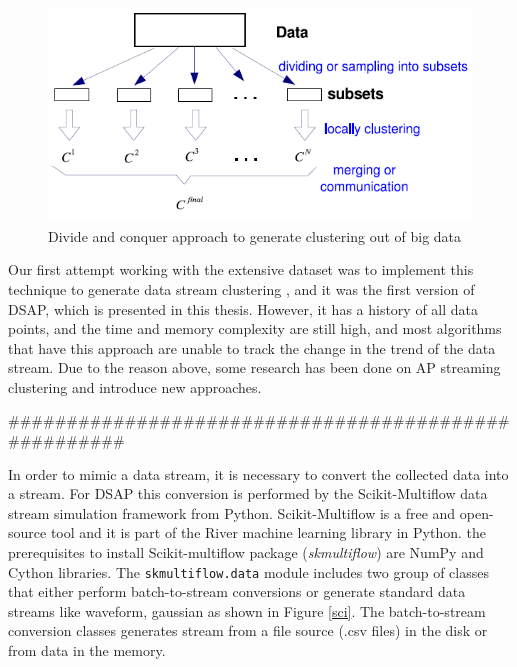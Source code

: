 \begin{figure}[!h]
    \centering
    \includegraphics[width = 11 cm]{image/Chapters/Chapter3/divide.PNG}
    \caption{Divide and conquer approach to generate clustering out of big data \protect\cite{zhang2009toward}}
    \label{dividee}
\end{figure}


Our first attempt working with the extensive dataset was to implement this technique to generate data stream clustering \cite{ivarispatio}, and it was the first version of DSAP, which is presented in this thesis. However, it has a history of all data points, and the time and memory complexity are still high, and most algorithms that have this approach are unable to track the change in the trend of the data stream. 
Due to the reason above, some research has been done on AP streaming clustering and introduce new approaches.

#####################################################

In order to mimic a data stream, it is necessary to convert the collected data into a stream. For DSAP this conversion is performed by the Scikit-Multiflow data stream simulation framework from Python.  Scikit-Multiflow is a free and open-source tool \cite{montiel2018scikit} and it is part of the River machine learning library in Python. the prerequisites to install Scikit-multiflow package (\textit{skmultiflow}) are NumPy and Cython libraries. The \texttt{skmultiflow.data} module includes two group of classes that either perform batch-to-stream conversions or generate standard data streams like waveform, gaussian as shown in Figure \ref{sci}. The batch-to-stream conversion classes generates stream from a file source (.csv files) in the disk or from data in the memory.

